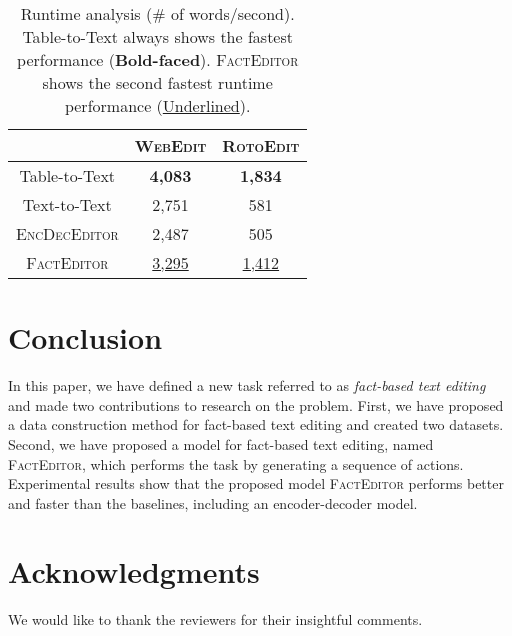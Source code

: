\documentclass[11pt,a4paper]{article}
\begin{document}
\begin{table}[t]
    \centering
    \small
    \begin{tabular}{c|cc}
        \toprule
        & \textsc{WebEdit} & \textsc{RotoEdit}\\\midrule
        Table-to-Text & \textbf{4,083} & \textbf{1,834}\\
        Text-to-Text & 2,751 & 581 \\
        \textsc{EncDecEditor} & 2,487 & 505\\
        \textsc{FactEditor} & \underline{3,295} & \underline{1,412}\\
        \bottomrule
    \end{tabular}
    \caption{Runtime analysis (\# of words/second). Table-to-Text always shows the fastest performance (\textbf{Bold-faced}). \textsc{FactEditor} shows the second fastest runtime performance  (\underline{Underlined}).}
    \label{tab:runtime}
\end{table}

\section{Conclusion}
In this paper, we have defined a new task referred to as \textit{fact-based text editing} and made two contributions to research on the problem. First, we have proposed a data construction method for fact-based text editing and created two datasets. Second, we have proposed a model for fact-based text editing, named \textsc{FactEditor}, which performs the task by generating a sequence of actions. Experimental results show that the proposed model \textsc{FactEditor} performs better and faster than the baselines, including an encoder-decoder model.

\section*{Acknowledgments}
We would like to thank the reviewers for their insightful comments. 


\end{document}
